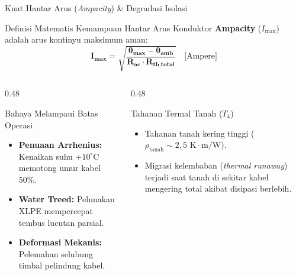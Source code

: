 \documentclass[aspectratio=169,10pt]{beamer}
\begin{document}
\begin{frame}{Kuat Hantar Arus (\textit{Ampacity}) \& Degradasi Isolasi}
  \begin{block}{Definisi Matematis Kemampuan Hantar Arus Konduktor}
    \small
    \textbf{Ampacity} ($I_{\text{max}}$) adalah arus kontinyu maksimum aman:
    \begin{equation*}
      \mathbf{I_{\text{max}} = \sqrt{\frac{\theta_{\text{max}} - \theta_{\text{amb}}}{R_{\text{ac}} \cdot R_{\text{th,total}}}}} \quad \text{[Ampere]}
    \end{equation*}
  \end{block}
  \begin{columns}[t]
    \begin{column}{0.48\textwidth}
      \begin{alertblock}{Bahaya Melampaui Batas Operasi}
        \small
        \begin{itemize}
          \item \textbf{Penuaan Arrhenius:} Kenaikan suhu $+10^\circ\text{C}$ memotong umur kabel $50\%$.
          \item \textbf{Water Treed:} Pelunakan XLPE mempercepat tembus lucutan parsial.
          \item \textbf{Deformasi Mekanis:} Pelemahan selubung timbal pelindung kabel.
        \end{itemize}
      \end{alertblock}
    \end{column}
    \begin{column}{0.48\textwidth}
      \begin{exampleblock}{Tahanan Termal Tanah ($T_4$)}
        \small
        \begin{itemize}
          \item Tahanan tanah kering tinggi ($\rho_{\text{tanah}} \sim 2{,}5\text{ K}\cdot\text{m/W}$).
          \item Migrasi kelembaban (\textit{thermal runaway}) terjadi saat tanah di sekitar kabel mengering total akibat disipasi berlebih.
        \end{itemize}
      \end{exampleblock}
    \end{column}
  \end{columns}
\end{frame}
\end{document}
